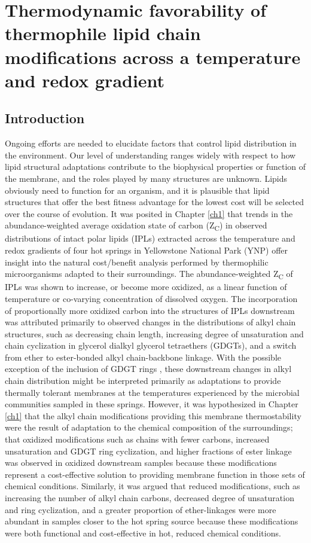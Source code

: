 \chapter{Thermodynamic favorability of thermophile lipid chain modifications across a temperature and redox gradient}\label{ch2}

\section{Introduction}

Ongoing efforts are needed to elucidate factors that control lipid distribution in the environment. Our level of understanding ranges widely with respect to how lipid structural adaptations contribute to the biophysical properties or function of the membrane, and the roles played by many structures are unknown. Lipids obviously need to function for an organism, and it is plausible that lipid structures that offer the best fitness advantage for the lowest cost will be selected over the course of evolution. It was posited in Chapter \ref{ch1} that trends in the abundance-weighted average oxidation state of carbon (Z\textsubscript{C}) in observed distributions of intact polar lipids (IPLs) extracted across the temperature and redox gradients of four hot springs in Yellowstone National Park (YNP) offer insight into the natural cost/benefit analysis performed by thermophilic microorganisms adapted to their surroundings. The abundance-weighted Z\textsubscript{C} of IPLs was shown to increase, or become more oxidized, as a linear function of temperature or co-varying concentration of dissolved oxygen. The incorporation of proportionally more oxidized carbon into the structures of IPLs downstream was attributed primarily to observed changes in the distributions of alkyl chain structures, such as decreasing chain length, increasing degree of unsaturation and chain cyclization in glycerol dialkyl glycerol tetraethers (GDGTs), and a switch from ether to ester-bonded alkyl chain-backbone linkage. With the possible exception of the inclusion of GDGT rings \citep[the function of which is still being explored;][]{sollich2017heat}, these downstream changes in alkyl chain distribution might be interpreted primarily as adaptations to provide thermally tolerant membranes at the temperatures experienced by the microbial communities sampled in these springs. However, it was hypothesized in Chapter \ref{ch1} that the alkyl chain modifications providing this membrane thermostability were the result of adaptation to the chemical composition of the surroundings; that oxidized modifications such as chains with fewer carbons, increased unsaturation and GDGT ring cyclization, and higher fractions of ester linkage was observed in oxidized downstream samples because these modifications represent a cost-effective solution to providing membrane function in those sets of chemical conditions. Similarly, it was argued that reduced modifications, such as increasing the number of alkyl chain carbons, decreased degree of unsaturation and ring cyclization, and a greater proportion of ether-linkages were more abundant in samples closer to the hot spring source because these modifications were both functional and cost-effective in hot, reduced chemical conditions.

